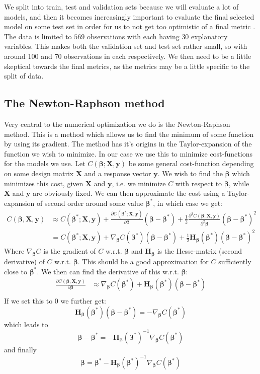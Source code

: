 \documentclass{article}
\begin{document}
We split into train, test and validation sets because we will evaluate a lot of
models, and then it becomes increasingly important to evaluate the final
selected model on some test set in order for us to not get too optimistic of a
final metric \cite[s.~7.2]{hastie2009elements}.  The data is limited to $569$
observations with each having $30$ explanatory variables. This makes both the
validation set and test set rather small, so with around $100$ and $70$
observations in each respectively. We then need to be a little skeptical towards
the final metrics, as the metrics may be a little specific to the split of data.

\subsection{The Newton-Raphson method}
Very central to the numerical optimization we do is the Newton-Raphson method.
This is a method which allows us to find the minimum of some function by using
its gradient. The method has it's origins in the Taylor-expansion of the
function we wish to minimize. In our case we use this to minimize cost-functions
for the models we use. Let $C(\bm{\beta}; \bm{X}, \bm{y})$ be some general
cost-function depending on some design matrix $\bm{X}$ and a response vector
$\bm{y}$. We wish to find the $\bm{\beta}$ which minimizes this cost, given
$\bm{X}$ and $\bm{y}$, i.e. we minimize $C$ with respect to $\bm{\beta}$, while
$\bm{X}$ and $\bm{y}$ are obviously fixed. We can then approximate the cost using a
Taylor-expansion of second order around some value $\bm{\beta}^*$, in which case
we get:
\begin{align*}
      C(\bm{\beta}, \bm{X}, \bm{y}) & \approx C(\bm{\beta}^*; \bm{X}, \bm{y}) + \frac{\partial C(\bm{\beta}^*; \bm{X}, \bm{y})}{\partial \bm{\beta}}(\bm{\beta} - \bm{\beta}^*) + \frac{1}{2} \frac{\partial^2 C(\bm{\beta}; \bm{X}, \bm{y})}{\partial^2 \bm{\beta}}(\bm{\beta} - \bm{\beta}^*)^2 \\
                                    & = C(\bm{\beta}^*; \bm{X}, \bm{y}) + \nabla_{\bm{\beta}} C(\bm{\beta}^*) (\bm{\beta} - \bm{\beta}^*) + \frac{1}{2} \bm{H}_{\bm{\beta}}(\bm{\beta}^*) (\bm{\beta} - \bm{\beta}^*)^2
\end{align*}
Where $\nabla_{\bm{\beta}} C$ is the gradient of $C$ w.r.t. $\bm{\beta}$ and
$\bm{H}_{\bm{\beta}}$ is the Hesse-matrix (second derivative) of $C$ w.r.t.
$\bm{\beta}$. This should be a good approximation for $C$ sufficiently close to
$\bm{\beta}^*$. We then can find the derivative of this w.r.t. $\bm{\beta}$:
\begin{align*}
      \frac{\partial C(\bm{\beta}, \bm{X}, \bm{y})}{\partial \bm{\beta}} & \approx
      \nabla_{\bm{\beta}} C(\bm{\beta}^*) + \bm{H}_{\bm{\beta}}(\bm{\beta}^*)(\bm{\beta} - \bm{\beta}^*) \\
\end{align*}
If we set this to $0$ we further get:
$$\bm{H}_{\bm{\beta}}(\bm{\beta}^*) (\bm{\beta} - \bm{\beta}^*) = -\nabla_{\bm{\beta}} C(\bm{\beta}^*)$$
which leads to
$$\bm{\beta} - \bm{\beta}^* = - \bm{H}_{\bm{\beta}}(\bm{\beta}^*)^{-1} \nabla_{\bm{\beta}} C(\bm{\beta}^*)$$
and finally
$$\bm{\beta} = \bm{\beta}^* - \bm{H}_{\bm{\beta}}(\bm{\beta}^*)^{-1} \nabla_{\bm{\beta}} C(\bm{\beta}^*)$$
\end{document}
